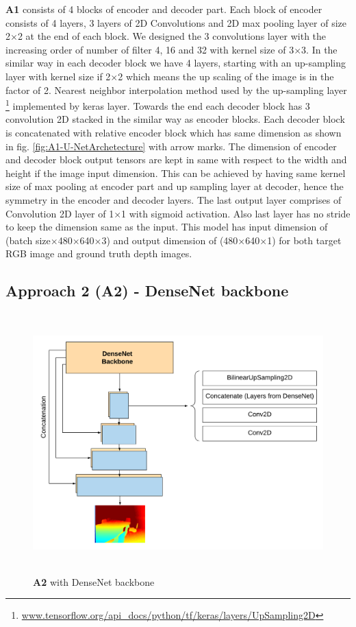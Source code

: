 \textbf{A1} consists of 4 blocks of encoder and decoder part. Each block of encoder consists of 4 layers, 3 layers of 2D Convolutions and 2D max pooling layer of size 2$\times$2 at the end of each block. We designed the 3 convolutions layer with the increasing order of number of filter 4, 16 and 32 with kernel size of 3$\times$3. In the similar way in each decoder block we have 4 layers, starting with an up-sampling layer with kernel size if 2$\times$2 which means the up scaling of the image is in the factor of 2. Nearest neighbor interpolation method used by the up-sampling layer \footnote{\url{www.tensorflow.org/api_docs/python/tf/keras/layers/UpSampling2D}} implemented by keras layer. Towards the end each decoder block has 3 convolution 2D stacked in the similar way as encoder blocks. Each decoder block is concatenated with relative encoder block which has same dimension as shown in fig. \ref{fig:A1-U-NetArchetecture} with arrow marks. The dimension of encoder and decoder block output tensors are kept in same with respect to the width and height if the image input dimension. This can be achieved by having same kernel size of max pooling at encoder part and up sampling layer at decoder, hence the symmetry in the encoder and decoder layers. The last output layer comprises of Convolution 2D layer of 1$\times$1 with sigmoid activation. Also last layer has no stride to keep the dimension same as the input. 
This model has input dimension of (batch size$\times$480$\times$640$\times$3) and output dimension of (480$\times$640$\times$1) for both target RGB image and ground truth depth images.



\subsection{Approach 2 (A2) - DenseNet backbone}

\begin{figure}[h]
    \centering
    \includegraphics[width = 15cm,  height = 10cm]{Figures/A2.png}
    \caption{\textbf{A2} with DenseNet backbone}
    \label{fig:A2-DenseNet-arch}
\end{figure}{}




